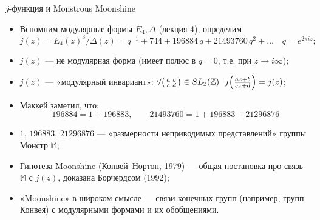 \documentclass[serif, aspectratio=169]{beamer}
\begin{document}
\begin{frame}{$j$-функция и Monstrous Moonshine}
    \begin{itemize}
        \item Вспомним модулярные формы $E_4, \Delta$ (лекция 4), определим
        \[j(z) = E_4(z)^3/\Delta(z) = q^{-1} + 744 + 196884\,q + 21493760\,q^2 + \dots \quad q=e^{2\pi i z};\]
        \item $j(z)$ --- не модулярная форма (имеет полюс в $q=0$, т.е. при $z\to i\infty$);
        \item $j(z)$ --- «модулярный инвариант»: $\forall\begin{psmallmatrix}a&b\\c&d\end{psmallmatrix}\in SL_2(\mathbb{Z})\ \ j\!\left(\tfrac{az+b}{cz+d}\right)=j(z)$;
        \item Маккей заметил, что:
        \[196884 = 1 + 196883,\qquad 21493760=1+196883+21296876\]
        \item $1$, $196883$, $21296876$ --- «размерности неприводимых представлений» группы Монстр $\mathbb M$;
        \item Гипотеза Moonshine (Конвей--Нортон, 1979) --- общая постановка про связь $\mathbb M$ с $j(z)$, доказана Борчердсом (1992);
        \item «Moonshine» в широком смысле --- связи конечных групп (например, групп Конвея) с модулярными формами и их обобщениями.
    \end{itemize}
\end{frame}
\end{document}
